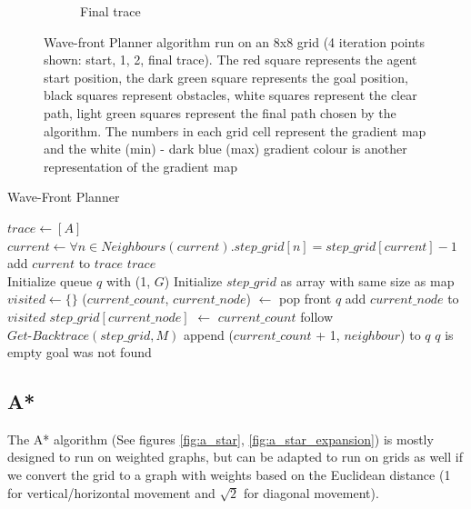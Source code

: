 \begin{figure}[]
\begin{subfigure}[b]{0.2\linewidth}
    \caption{Final trace}
  \end{subfigure}
  \caption{Wave-front Planner algorithm run on an 8x8 grid (4 iteration points shown: start, 1, 2, final trace). The red square represents the agent start position, the dark green square represents the goal position, black squares represent obstacles, white squares represent the clear path, light green squares represent the final path chosen by the algorithm. The numbers in each grid cell represent the gradient map and the white (min) - dark blue (max) gradient colour is another representation of the gradient map}
  \label{fig:wave_front_planner}
\end{figure}

\begin{algorithm}[h!]
\caption{Wave-Front Planner}
\label{alg: wave_front_planner}
\begin{algorithmic}[1]

    \State $trace \gets [A]$
        \State $current \gets \forall n \in Neighbours(current). step\_grid[n] = step\_grid[current] - 1$
        \State add $current$ to $trace$
    \EndWhile
    \State \Return $trace$
\EndProcedure
\\
    
    \State Initialize queue $q$ with (1, $G$)
    \State Initialize $step\_grid$ as array with same size as map
    \State $visited \gets \{\}$
    \State
    \Repeat
        \State ($current\_count$, $current\_node$) $\gets$ pop front $q$
        \State add $current\_node$ to $visited$
        \State $step\_grid[current\_node]$ $\gets$ $current\_count$
        \State
            \State follow $\textit{Get-Backtrace}(step\_grid, M)$
            \State \Return 
        \EndIf
        \State
                \State append ($current\_count$ + 1, $neighbour$) to $q$
            \EndIf
        \EndFor
    \Until $q$ is empty
    \State
    \State goal was not found
\EndProcedure
\end{algorithmic}
\end{algorithm}

\subsection{A*} \label{sec:a_star}
The A* algorithm \cite{choset2005principles, duchovn2014path, zhang2014multiple, 5937169} (See figures \ref{fig:a_star}, \ref{fig:a_star_expansion}) is mostly designed to run on weighted graphs, but can be adapted to run on grids as well if we convert the grid to a graph with weights based on the Euclidean distance (1 for vertical/horizontal movement and $\sqrt{2}$ for diagonal movement).

